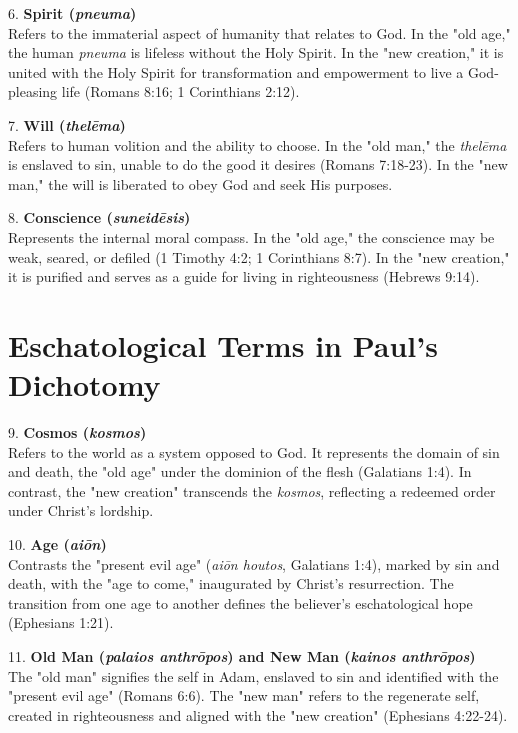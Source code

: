 \documentclass{article}
\begin{document}
6. \textbf{Spirit (\textit{pneuma})} \\
   \hspace*{0.5cm} Refers to the immaterial aspect of humanity that relates to God. In the "old age," the human \textit{pneuma} is lifeless without the Holy Spirit. In the "new creation," it is united with the Holy Spirit for transformation and empowerment to live a God-pleasing life (Romans 8:16; 1 Corinthians 2:12).

7. \textbf{Will (\textit{thelēma})} \\
   \hspace*{0.5cm} Refers to human volition and the ability to choose. In the "old man," the \textit{thelēma} is enslaved to sin, unable to do the good it desires (Romans 7:18-23). In the "new man," the will is liberated to obey God and seek His purposes.

8. \textbf{Conscience (\textit{suneidēsis})} \\
   \hspace*{0.5cm} Represents the internal moral compass. In the "old age," the conscience may be weak, seared, or defiled (1 Timothy 4:2; 1 Corinthians 8:7). In the "new creation," it is purified and serves as a guide for living in righteousness (Hebrews 9:14).

\section*{Eschatological Terms in Paul's Dichotomy}

9. \textbf{Cosmos (\textit{kosmos})} \\
   \hspace*{0.5cm} Refers to the world as a system opposed to God. It represents the domain of sin and death, the "old age" under the dominion of the flesh (Galatians 1:4). In contrast, the "new creation" transcends the \textit{kosmos}, reflecting a redeemed order under Christ's lordship.

10. \textbf{Age (\textit{aiōn})} \\
   \hspace*{0.5cm} Contrasts the "present evil age" (\textit{aiōn houtos}, Galatians 1:4), marked by sin and death, with the "age to come," inaugurated by Christ's resurrection. The transition from one age to another defines the believer's eschatological hope (Ephesians 1:21).

11. \textbf{Old Man (\textit{palaios anthrōpos}) and New Man (\textit{kainos anthrōpos})} \\
   \hspace*{0.5cm} The "old man" signifies the self in Adam, enslaved to sin and identified with the "present evil age" (Romans 6:6). The "new man" refers to the regenerate self, created in righteousness and aligned with the "new creation" (Ephesians 4:22-24).
\end{document}
